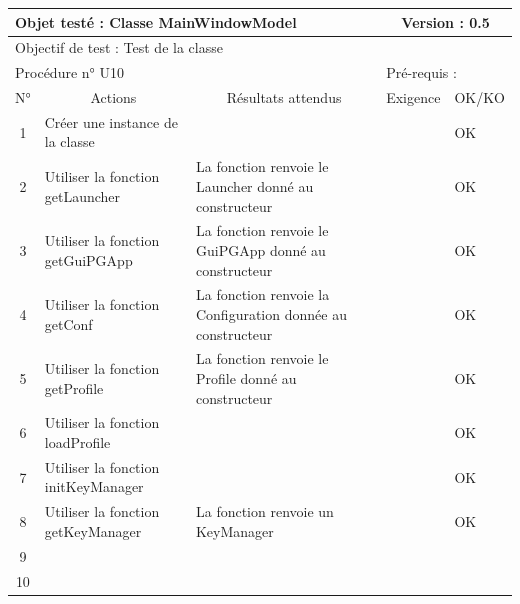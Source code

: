 \documentclass{../res/univ-projet}
\begin{document}
\begin{center}
    \begin{tabular}{|c|p{5cm}|p{5cm}|p{1.5cm}|p{1.5cm}|}
      \hline
      \multicolumn{3}{|l|}{Objet testé : Classe MainWindowModel} & \multicolumn{2}{c|}{Version : 0.5}\\ \hline
      \multicolumn{5}{|l|}{Objectif de test : Test de la classe}\\ \hline
      \multicolumn{3}{|l|}{Procédure n° U10} & \multicolumn{2}{p{3cm}|}{Pré-requis : }\\ \hline
      \multicolumn{1}{|c|}{N°} & \multicolumn{1}{c|}{Actions} & \multicolumn{1}{c|}{Résultats attendus} & 
      \multicolumn{1}{c|}{Exigence} & \multicolumn{1}{c|}{OK/KO}\\ \hline
      1 & Créer une instance de la classe &  &  & OK \\
      2 & Utiliser la fonction getLauncher & La fonction renvoie le Launcher donné au constructeur &  & OK \\
      3 & Utiliser la fonction getGuiPGApp & La fonction renvoie le GuiPGApp donné au constructeur &  & OK \\
      4 & Utiliser la fonction getConf & La fonction renvoie la Configuration donnée au constructeur &  & OK \\
      5 & Utiliser la fonction getProfile & La fonction renvoie le Profile donné au constructeur &  & OK \\
      6 & Utiliser la fonction loadProfile &  &  & OK \\
      7 & Utiliser la fonction initKeyManager &  &  & OK \\
      8 & Utiliser la fonction getKeyManager & La fonction renvoie un KeyManager &  & OK \\
      9 &  &  &  &  \\
      10 &  &  &  &  \\ 
  \hline
    \end{tabular}
    \vskip 2.2cm



\end{center}
\end{document}
